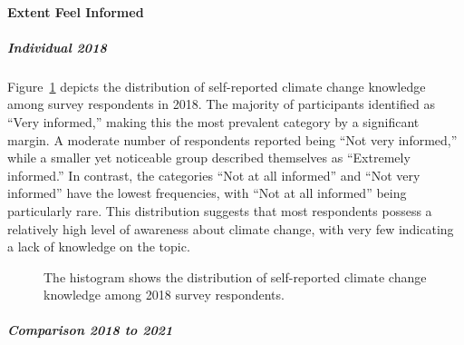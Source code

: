 \documentclass[
  letterpaper,
  DIV=11,
  numbers=noendperiod]{scrartcl}
\let\oldparagraph\paragraph
\renewcommand{\paragraph}[1]{\oldparagraph{#1}\mbox{}}
\let\oldsubparagraph\subparagraph
\renewcommand{\subparagraph}[1]{\oldsubparagraph{#1}\mbox{}}
\begin{document}
\paragraph{Extent Feel Informed}\label{extent-feel-informed}

\subparagraph{Individual 2018}\label{individual-2018-2}

Figure~\ref{fig-five} depicts the distribution of self-reported climate
change knowledge among survey respondents in 2018. The majority of
participants identified as ``Very informed,'' making this the most
prevalent category by a significant margin. A moderate number of
respondents reported being ``Not very informed,'' while a smaller yet
noticeable group described themselves as ``Extremely informed.'' In
contrast, the categories ``Not at all informed'' and ``Not very
informed'' have the lowest frequencies, with ``Not at all informed''
being particularly rare. This distribution suggests that most
respondents possess a relatively high level of awareness about climate
change, with very few indicating a lack of knowledge on the topic.

\begin{figure}


\caption{\label{fig-five}The histogram shows the distribution of
self-reported climate change knowledge among 2018 survey respondents.}

\end{figure}%

\subparagraph{Comparison 2018 to 2021}\label{comparison-2018-to-2021-2}
\end{document}
